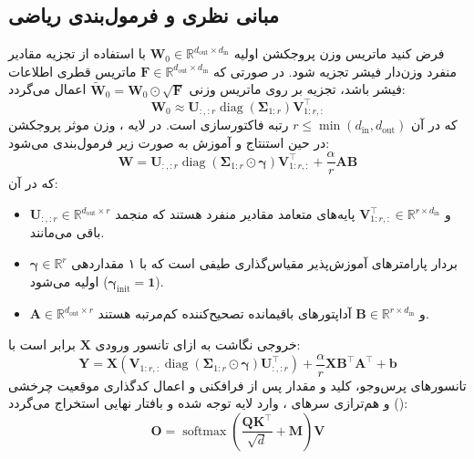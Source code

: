 \subsection{مبانی نظری و فرمول‌بندی ریاضی}
فرض کنید ماتریس وزن پروجکشن اولیه $\mathbf{W}_0 \in \mathbb{R}^{d_{\text{out}} \times d_{\text{in}}}$ با استفاده از تجزیه مقادیر منفرد وزن‌دار فیشر تجزیه شود. در صورتی که $\mathbf{F} \in \mathbb{R}^{d_{\text{out}} \times d_{\text{in}}}$ ماتریس قطری اطلاعات فیشر باشد، تجزیه بر روی ماتریس وزنی $\tilde{\mathbf{W}}_0 = \mathbf{W}_0 \odot \sqrt{\mathbf{F}}$ اعمال می‌گردد:
\begin{equation}
\mathbf{W}_0 \approx \mathbf{U}_{:, :r} \operatorname{diag}(\boldsymbol{\Sigma}_{1:r}) \mathbf{V}_{1:r, :}^\top
\end{equation}
که در آن $r \le \min(d_{\text{in}}, d_{\text{out}})$ رتبه فاکتورسازی است. در لایه ، وزن موثر پروجکشن در حین استنتاج و آموزش به صورت زیر فرمول‌بندی می‌شود:
\begin{equation}
\mathbf{W} = \mathbf{U}_{:, :r} \operatorname{diag}(\boldsymbol{\Sigma}_{1:r} \odot \boldsymbol{\gamma}) \mathbf{V}_{1:r, :}^\top + \frac{\alpha}{r} \mathbf{A} \mathbf{B}
\end{equation}
که در آن:
\begin{itemize}
    \item $\mathbf{U}_{:, :r} \in \mathbb{R}^{d_{\text{out}} \times r}$ و $\mathbf{V}_{1:r, :}^\top \in \mathbb{R}^{r \times d_{\text{in}}}$ پایه‌های متعامد مقادیر منفرد هستند که منجمد باقی می‌مانند.
    \item $\boldsymbol{\gamma} \in \mathbb{R}^r$ بردار پارامترهای آموزش‌پذیر مقیاس‌گذاری طیفی است که با ۱ مقداردهی اولیه می‌شود ($\boldsymbol{\gamma}_{\text{init}} = \mathbf{1}$).
    \item $\mathbf{A} \in \mathbb{R}^{d_{\text{out}} \times r}$ و $\mathbf{B} \in \mathbb{R}^{r \times d_{\text{in}}}$ آداپتورهای باقیمانده تصحیح‌کننده کم‌مرتبه هستند.
\end{itemize}
خروجی نگاشت به ازای تانسور ورودی $\mathbf{X}$ برابر است با:
\begin{equation}
\mathbf{Y} = \mathbf{X} \left( \mathbf{V}_{1:r, :} \operatorname{diag}(\boldsymbol{\Sigma}_{1:r} \odot \boldsymbol{\gamma}) \mathbf{U}_{:, :r}^\top \right) + \frac{\alpha}{r} \mathbf{X} \mathbf{B}^\top \mathbf{A}^\top + \mathbf{b}
\end{equation}
تانسورهای پرس‌وجو، کلید و مقدار پس از فرافکنی و اعمال کدگذاری موقعیت چرخشی () و هم‌ترازی سرهای ، وارد لایه توجه شده و بافتار نهایی استخراج می‌گردد:
\begin{equation}
\mathbf{O} = \operatorname{softmax}\left(\frac{\mathbf{Q} \mathbf{K}^\top}{\sqrt{d}} + \mathbf{M}\right) \mathbf{V}
\end{equation}

